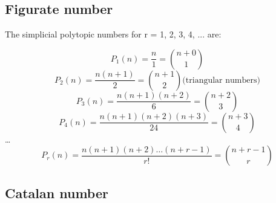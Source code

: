 \subsection{Figurate number}
The simplicial polytopic numbers for r = 1, 2, 3, 4, ... are:\cite{comb4}

\begin{equation}
P_1(n) = \frac{n}{1} = {{n+0}\choose{1}}
\end{equation}
\begin{equation}
P_2(n) = \frac{n(n+1)}{2} = {{n+1}\choose{2}} \mbox{(triangular numbers)}
\end{equation}
\begin{equation}
P_3(n) = \frac{n(n+1)(n+2)}{6} = {{n+2}\choose{3}}
\end{equation}
\begin{equation}
P_4(n) = \frac{n(n+1)(n+2)(n+3)}{24} = {{n+3}\choose{4}}
\end{equation}
\ldots\\
\begin{equation}
P_r(n) = \frac{n(n+1)(n+2)\ldots(n+r-1)}{r!} = {{n+r-1}\choose{r}}
\end{equation}

\subsection{Catalan number}
